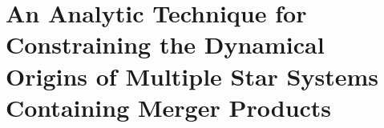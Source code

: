 \pagestyle{fancy}
\headheight 20pt
\chead{}
\lfoot{}
\cfoot{\thepage}
\rfoot{}
\renewcommand{\headrulewidth}{0.1pt}
\renewcommand{\footrulewidth}{0.1pt}




\chapter{An Analytic Technique for Constraining the 
  Dynamical Origins of Multiple Star Systems Containing Merger
  Products} \label{chapter2}
%
\thispagestyle{fancy}
%
%
%

